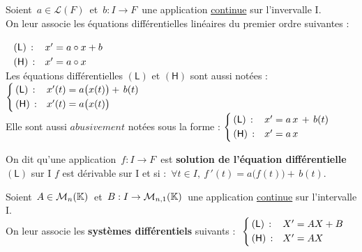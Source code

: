 Soient \(\, a\in \mathscr{L}(F)\, \) et \(\, b:I\to F\,\) une application \underline{continue} sur l'invervalle I.\vspace{-0.3cm} \\
On leur associe les équations différentielles linéaires du premier ordre suivantes :\(\; \begin{array}{ll}
    & \\
    (\mathsf{L})\, : & x'=a\circ x+b\vspace{0.1cm} \\
    (\mathsf{H})\,: & x'=a\circ x
\end{array}\)\vspace{0.4cm} \\
Les équations différentielles $(\mathsf{L})$ et $(\mathsf{H})$ sont aussi notées : \(
\left\{\!\!\begin{array}{ll}
    (\mathsf{L})\,: & x'(t)=a\bigl(x(t)\bigr)+\,b(t)\vspace{0.1cm}\\
    (\mathsf{H})\,: & x'(t)=a\bigl(x(t)\bigr)
\end{array}\right.\)\vspace{0.5cm}\\
Elle sont aussi $abusivement$ notées sous la forme : \(
    \left\{\!\!\begin{array}{ll}
        (\mathsf{L})\,: & x'=a\,x\,+\,b(t)\vspace{0.1cm}\\
        (\mathsf{H})\,: & x'=a\,x
    \end{array}\right.\)

\vspace{1.6cm}

On dit qu'une application \(\,f:I\to F\,\) est \textbf{solution de l'équation différentielle} $(\mathsf{L})$ sur I \ssi $f$ est dérivable sur I et si : \(\, \forall t\in I,\ f\,'(t)=a\bigl(f(t)\bigr)+\,b(t).\)

\vspace{2cm}

Soient \(\,A\in \mathcal{M}_n(\mathbb{K})\,\) et \(\,B:I\to \mathcal{M}_{n,1}(\mathbb{K})\,\) une application \underline{continue} sur l'intervalle I.\vspace{0.3cm}\\
On leur associe les \textbf{systèmes différentiels} suivants : \(\ \left\{\!\! 
\begin{array}{ll}
    (\mathsf{L})\,: & X'=A X+B\vspace{0.1cm}\\
    (\mathsf{H})\,: & X'=A X
\end{array}\right.\)


